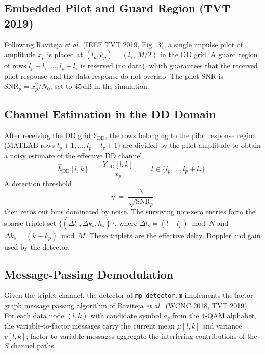 \documentclass[11pt,a4paper]{article}
\begin{document}
\subsection{Embedded Pilot and Guard Region (TVT 2019)}
Following Raviteja \emph{et al.} (IEEE TVT 2019, Fig.~3), a single
impulse pilot of amplitude $x_p$ is placed at
$(l_p,k_p) = (l_\tau,\,M/2)$ in the DD grid. A guard region of rows
$l_p - l_\tau,\dots,l_p + l_\tau$ is reserved (no data), which
guarantees that the received pilot response and the data response do
not overlap. The pilot SNR is $\mathrm{SNR}_p = x_p^2/N_0$, set to
$45$\,dB in the simulation.

\subsection{Channel Estimation in the DD Domain}
After receiving the DD grid $Y_{\mathrm{DD}}$, the rows belonging to
the pilot response region (MATLAB rows $l_p+1,\dots,l_p+l_\tau+1$) are
divided by the pilot amplitude to obtain a noisy estimate of the
effective DD channel,
\begin{equation}
  \hat h_{\mathrm{DD}}[l,k]
  \;=\; \frac{Y_{\mathrm{DD}}[l,k]}{x_p},
  \qquad l\in\{l_p,\dots,l_p+l_\tau\}.
\end{equation}
A detection threshold
\begin{equation}
  \eta \;=\; \frac{3}{\sqrt{\mathrm{SNR}_p}}
\end{equation}
then zeros out bins dominated by noise. The surviving non-zero
entries form the sparse triplet set
$\{(\Delta l_s,\Delta k_s,\tilde h_s)\}$, where
$\Delta l_s = (l - l_p)\bmod N$ and
$\Delta k_s = (k - k_p)\bmod M$. These triplets are the effective
delay, Doppler and gain used by the detector.

\subsection{Message-Passing Demodulation}
Given the triplet channel, the detector of \texttt{mp\_detector.m}
implements the factor-graph message passing algorithm of Raviteja
\emph{et al.}\ (WCNC 2018, TVT 2019). For each data node $(l,k)$ with
candidate symbol $a_q$ from the 4-QAM alphabet, the variable-to-factor
messages carry the current mean $\mu[l,k]$ and variance $v[l,k]$;
factor-to-variable messages aggregate the interfering contributions of
the $S$ channel paths.
\end{document}
